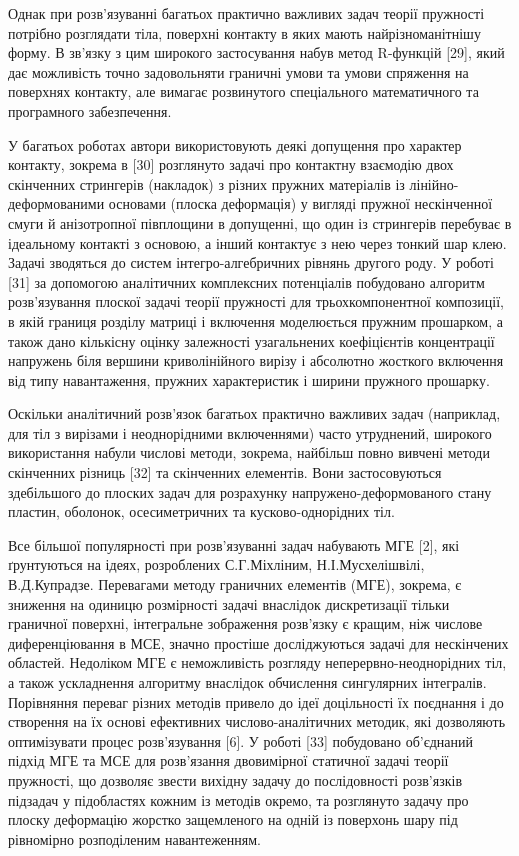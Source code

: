 Однак при розв'язуванні багатьох практично важливих задач теорії
пружності потрібно розглядати тіла, поверхні контакту в яких мають
найрізноманітнішу форму. В зв'язку з цим широкого застосування набув
метод R-функцій {[}29{]}, який дає можливість точно задовольняти
граничні умови та умови спряження на поверхнях контакту, але вимагає
розвинутого спеціального математичного та програмного забезпечення.

У багатьох роботах автори використовують деякі допущення про характер
контакту, зокрема в {[}30{]} розглянуто задачі про контактну взаємодію
двох скінченних стрингерів (накладок) з різних пружних матеріалів із
лінійно-деформованими основами (плоска деформація) у вигляді пружної
нескінченної смуги й анізотропної півплощини в допущенні, що один із
стрингерів перебуває в ідеальному контакті з основою, а інший контактує
з нею через тонкий шар клею. Задачі зводяться до систем
інтегро-алгебричних рівнянь другого роду. У роботі {[}31{]} за допомогою
аналітичних комплекс­них потенціалів побудовано алгоритм розв'язування
плоскої задачі теорії пружності для трьохкомпонентної композиції, в якій
границя розділу матриці і включення моделюється пружним прошарком, а
також дано кількісну оцінку залежності узагальнених коефіцієнтів
концентрації напружень біля вершини криволі­нійного вирізу і абсолютно
жосткого включення від типу навантаження, пружних характеристик і ширини
пружного прошарку.

Оскільки аналітичний розв'язок багатьох практично важливих задач
(наприклад, для тіл з вирізами і неоднорідними включеннями) часто
утруднений, широкого використання набули числові методи, зокрема,
найбільш повно вивчені методи скінченних різниць {[}32{]} та скінченних
елементів. Вони застосовуються здебільшого до плоских задач для
розрахунку напружено-деформованого стану пластин, оболонок,
осесиметричних та кусково-однорідних тіл.

Все більшої популярності при розв'язуванні задач набувають МГЕ {[}2{]},
які ґрунтуються на ідеях, розроблених С.Г.Міхліним, Н.І.Мусхелішвілі,
В.Д.Купрадзе. Перевагами методу граничних елементів (МГЕ), зокрема, є
зниження на одиницю розмірності задачі внаслідок дискретизації тільки
граничної поверхні, інтегральне зображення розв'язку є кращим, ніж
числове диференціювання в МСЕ, значно простіше досліджуються задачі для
нескінчених областей. Недоліком МГЕ є неможливість розгляду
неперервно-неоднорідних тіл, а також ускладнення алгоритму внаслідок
обчислення сингулярних інтегралів. Порівняння переваг різних методів
привело до ідеї доцільності їх поєднання і до створення на їх основі
ефективних числово-аналітичних методик, які дозволяють оптимізувати
процес розв'язування {[}6{]}. У роботі {[}33{]} побудовано об'єднаний
підхід МГЕ та МСЕ для розв'язання двовимірної статичної задачі теорії
пружності, що дозволяє звести вихідну задачу до послідовності розв'язків
підзадач у підобластях кожним із методів окремо, та розглянуто задачу
про плоску деформацію жорстко защемленого на одній із поверхонь шару під
рівномірно розподіленим навантеженням.

